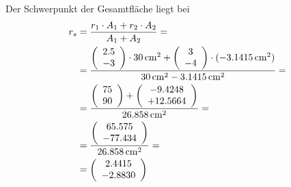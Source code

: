 \begin{aufgabe}
\begin{loesung}
	Der Schwerpunkt der Gesamtfläche liegt bei
	\begin{eqnarray*}
		\begin{split}
		r_s &=\frac{r_1\cdot A_1 + r_2\cdot A_2}{A_1 + A_2} =\\
		&=\frac{{\left(\begin{array}{c}2.5\\-3\end{array}\right)}\cdot\SI{30}{cm^2} + {\left(\begin{array}{c}3\\-4\end{array}\right)}\cdot (-\SI{3.1415}{cm^2})}{\SI{30}{cm^2}-\SI{3.1415}{cm^2}}=\\
            &=\frac{{\left(\begin{array}{c}75\\90\end{array}\right)} + {\left(\begin{array}{c}-9.4248\\+12.5664\end{array}\right)}}{\SI{26.858}{cm^2}} =\\
            &=\frac{{\left(\begin{array}{c}65.575\\-77.434\end{array}\right)}}{\SI{26.858}{cm^2}} =\\
            &={\left(\begin{array}{c}2.4415\\-2.8830\end{array}\right)}
		\end{split}
	\end{eqnarray*}



\end{loesung}










\end{aufgabe}


